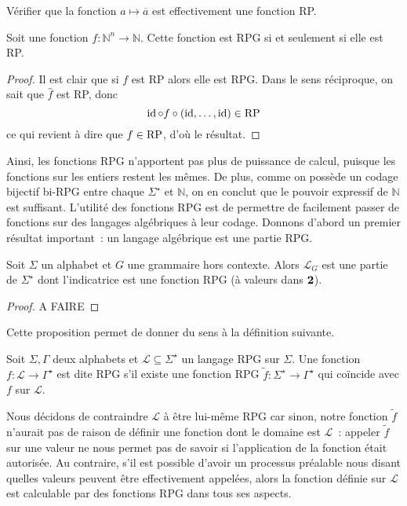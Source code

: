 \begin{exercise}
  Vérifier que la fonction $a \mapsto \overline a$ est effectivement une
  fonction RP.
\end{exercise}

\begin{theorem}
  Soit une fonction $f : \mathbb N^n \to \mathbb N$. Cette fonction est
  RPG si et seulement si elle est RP.
\end{theorem}

\begin{proof}
  Il est clair que si $f$ est RP alors elle est RPG. Dans le sens réciproque,
  on sait que $\hat f$ est RP, donc
  \[\operatorname{id}\circ f \circ (\operatorname{id},\ldots,\operatorname{id}) \in \operatorname{RP}\]
  ce qui revient à dire que $f \in \operatorname{RP}$, d'où le résultat.
\end{proof}

Ainsi, les fonctions RPG n'apportent pas plus de puissance de calcul, puisque
les fonctions sur les entiers restent les mêmes. De plus, comme on possède un
codage bijectif bi-RPG entre chaque $\Sigma^\star$ et $\mathbb N$, on en conclut
que le pouvoir expressif de $\mathbb N$ est suffisant. L'utilité des fonctions
RPG est de permettre de facilement passer de fonctions sur des langages
algébriques à leur codage. Donnons d'abord un premier résultat important~: un
langage algébrique est une partie RPG.

\begin{proposition}
  Soit $\Sigma$ un alphabet et $G$ une grammaire hors contexte. Alors
  $\mathcal L_G$ est une partie de $\Sigma^\star$ dont l'indicatrice est
  une fonction RPG (à valeurs dans $\boldsymbol{2}$).
\end{proposition}

\begin{proof}
  A FAIRE
\end{proof}

Cette proposition permet de donner du sens à la définition suivante.

\begin{definition}
  Soit $\Sigma,\Gamma$ deux alphabets et $\mathcal L \subseteq \Sigma^\star$ un
  langage RPG sur $\Sigma$. Une fonction $f : \mathcal L \to \Gamma^\star$
  est dite RPG s'il existe une fonction RPG
  $\tilde f : \Sigma^\star \to \Gamma^\star$ qui coïncide avec $f$ sur
  $\mathcal L$.
\end{definition}

\begin{remark}
  Nous décidons de contraindre $\mathcal L$ à être lui-même RPG car sinon,
  notre fonction $\tilde f$ n'aurait pas de raison de définir une fonction dont
  le domaine est $\mathcal L$~: appeler $\tilde f$ sur une valeur ne nous
  permet pas de savoir si l'application de la fonction était autorisée. Au
  contraire, s'il est possible d'avoir un processus préalable nous disant
  quelles valeurs peuvent être effectivement appelées, alors la fonction définie
  sur $\mathcal L$ est calculable par des fonctions RPG dans tous ses aspects.
\end{remark}


